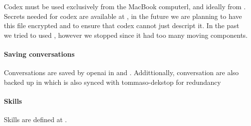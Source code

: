 

Codex must be used exclusively from the MacBook computerl, and ideally from .
Secrets needed for codex are available at , in the future we are planning to have this file encrypted and to ensure that codex cannot just descript it.
In the past we tried to used , however we stopped since it had too many moving components.

\paragraph{Saving conversations}
Conversations are saved by openai in  and .
Addittionally, conversation are also backed up in  which is also synced with tommaso-dekstop for redundancy

\paragraph{Skills}
Skills are defined  at .


